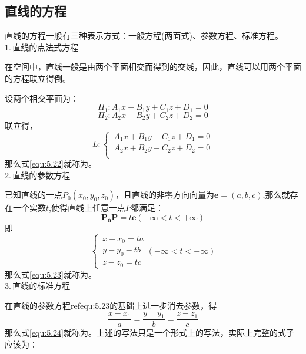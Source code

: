 \subsection{直线的方程}
直线的方程一般有三种表示方式：一般方程(两面式)、参数方程、标准方程。\\
1.$\,$直线的点法式方程
\par 在空间中，直线一般是由两个平面相交而得到的交线，因此，直线可以用两个平面的方程联立得倒。
\par 设两个相交平面为：
\begin{equation}
	\nonumber
	\Pi_1:A_1x+B_1y+C_1z+D_1=0
\end{equation}
\begin{equation}
	\nonumber
\Pi_2: A_2x+B_2y+C_2z+D_2=0
\end{equation}
联立得，
\begin{equation}
	L:\begin{cases}
	\, A_1x+B_1y+C_1z+D_1=0\\
	\, 	A_2x+B_2y+C_2z+D_2=0\\
		\end{cases}
	\label{equ:5.22}
\end{equation}
那么式\eqref{equ:5.22}就称为。
\\ 2.$\,$直线的参数方程
\par 已知直线的一点$P_0(x_0,y_0,z_0)$，且直线的非零方向向量为$\boldsymbol{e}=(a,b,c)$,那么就存在一个实数$t$,使得直线上任意一点$P$都满足：
\begin{equation}
	\boldsymbol{P_0P}=t\boldsymbol{e}(-\infty<t<+\infty)
\end{equation}
即
\begin{equation}
	\begin{cases}
		\, x-x_0=ta\\
		\, y-y_0-tb\\
		\, z-z_0=tc
	\end{cases}
(-\infty<t<+\infty)
\label{equ:5.23}
\end{equation}
那么式\eqref{equ:5.23}就称为。
\\ 3.$\,$直线的标准方程
\par 在直线的参数方程ref{equ:5.23}的基础上进一步消去参数，得
\begin{equation}
	\frac{x-x_1}{a}=\frac{y-y_1}{b}=\frac{z-z_1}{c}
\label{equ:5.24}
\end{equation}
那么式\eqref{equ:5.24}就称为。上述的写法只是一个形式上的写法，实际上完整的式子应该为：

